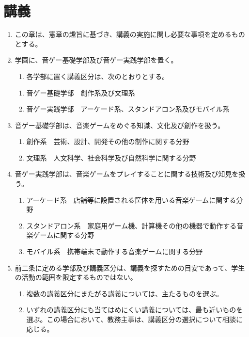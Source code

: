 \newpage
\chapter{講義}
\begin{enumerate}[label=第\arabic*条　]
  \item この章は、憲章の趣旨に基づき、講義の実施に関し必要な事項を定めるものとする。
  \item 学園に、音ゲー基礎学部及び音ゲー実践学部を置く。
  \begin{enumerate}[label=\arabic*　,start=2,leftmargin=*]
    \item 各学部に置く講義区分は、次のとおりとする。
  \end{enumerate}
    \begin{enumerate}[label=(\arabic*)　]
      \item 音ゲー基礎学部　創作系及び文理系
      \item 音ゲー実践学部　アーケード系、スタンドアロン系及びモバイル系
    \end{enumerate}
\item 音ゲー基礎学部は、音楽ゲームをめぐる知識、文化及び創作を扱う。
    \begin{enumerate}[label=(\arabic*)　]
      \item 創作系　芸術、設計、開発その他の制作に関する分野
      \item 文理系　人文科学、社会科学及び自然科学に関する分野
    \end{enumerate}
\item 音ゲー実践学部は、音楽ゲームをプレイすることに関する技術及び知見を扱う。
    \begin{enumerate}[label=(\arabic*)　]
      \item アーケード系　店舗等に設置される筐体を用いる音楽ゲームに関する分野
      \item スタンドアロン系　家庭用ゲーム機、計算機その他の機器で動作する音楽ゲームに関する分野
      \item モバイル系　携帯端末で動作する音楽ゲームに関する分野
    \end{enumerate}
\item 前二条に定める学部及び講義区分は、講義を探すための目安であって、学生の活動の範囲を限定するものではない。
  \begin{enumerate}[label=\arabic*　,start=2,leftmargin=*]
    \item 複数の講義区分にまたがる講義については、主たるものを選ぶ。
    \item いずれの講義区分にも当てはめにくい講義については、最も近いものを選ぶ。この場合において、教務主事は、講義区分の選択について相談に応じる。

\end{enumerate}
\end{enumerate}
